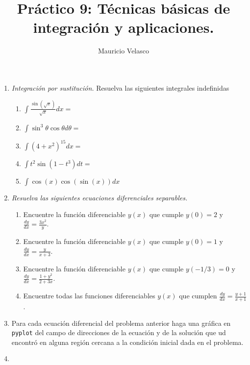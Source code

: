\documentclass[12pt, a4paper]{article}
\date{}
\begin{document}
\title{Pr\'actico 9: Técnicas básicas de integración y aplicaciones.}
\author{Mauricio Velasco}
\maketitle{}
\begin{enumerate}
\item {\it Integración por sustitución.}  Resuelva las siguientes integrales indefinidas

\begin{enumerate}
\item $\int\frac{\sin(\sqrt{x})}{\sqrt{x}}dx=$
\item $\int \sin^3\theta\cos\theta d\theta=$
\item $\int (4+x^2)^{15}dx=$
\item $\int t^2\sin(1-t^3)dt=$
\item $\int \cos(x)\cos(\sin(x))dx$
\end{enumerate}

\item {\it Resuelva las siguientes ecuaciones diferenciales separables.}
\begin{enumerate}
\item Encuentre la función diferenciable $y(x)$ que cumple $y(0)=2$ y $\frac{dy}{dx}=\frac{3x^2}{y}$.
\item Encuentre la función diferenciable $y(x)$ que cumple $y(0)=1$ y $\frac{dy}{dx}=\frac{y}{x+3}$.

\item Encuentre la función diferenciable $y(x)$ que cumple $y(-1/3)=0$ y $\frac{dy}{dx}=\frac{1+y^2}{2+3x}$.
\item Encuentre todas las funciones diferenciables $y(x)$ que cumplen $\frac{dy}{dx}=\frac{y+1}{x+1}$.
\end{enumerate}

\item Para cada ecuación diferencial del problema anterior haga una gráfica en \verb!pyplot! del campo de direcciones de la ecuación y de la solución que ud encontró en alguna región cercana a la condición inicial dada en el problema.

\item 

\end{enumerate}
\end{document}
